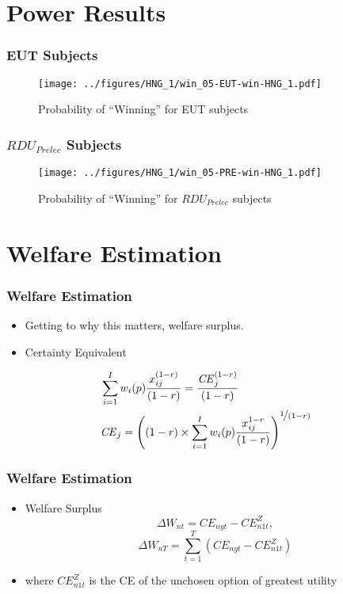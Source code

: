 \documentclass{beamer}
\newcommand\CE{\ensuremath{\mathit{CE}}}    %
\begin{document}
\section{Power Results}
\begin{frame}
\frametitle{EUT Subjects}
\begin{figure}[h!]
	\center
	\caption{Probability of \enquote{Winning} for EUT subjects}
	\texttt{[image: ../figures/HNG\_1/win\_05-EUT-win-HNG\_1.pdf]}
	\label{fig:HN1_win_eut}
\end{figure}
\end{frame}

\begin{frame}
\frametitle{ $\mathit{RDU_{Prelec}}$ Subjects}
\begin{figure}[h!]
	\center
	\caption{Probability of \enquote{Winning} for $\mathit{RDU_{Prelec}}$ subjects}
	\texttt{[image: ../figures/HNG\_1/win\_05-PRE-win-HNG\_1.pdf]}
	\label{fig:HN1_win_pre}
\end{figure}
\end{frame}

\section{Welfare Estimation}
\begin{frame}
\frametitle{Welfare Estimation}
\begin{itemize}
	\item Getting to why this matters, welfare surplus.
	\item Certainty Equivalent
\end{itemize}
\begin{align}
	\label{eq4:CEcalc}
	\begin{split}
		&\sum_{i=1}^{I} w_i(p) \frac{x_{ij}^{(1-r)}}{(1-r)} = \frac{ {\CE}_j^{(1-r)}}{(1-r)}\\
		&{\CE}_j =  \left( (1-r) \times \sum_{i=1}^{I} w_i(p) \frac{x_{ij}^{1-r}}{(1-r)} \right)^{ \displaystyle\nicefrac{1}{(1-r)} }
	\end{split}
\end{align}

\end{frame}

\begin{frame}
\frametitle{Welfare Estimation}
\begin{itemize}
	\item Welfare Surplus
	\begin{equation}
		\label{eq4:wsurplus}
		\Delta W_{nt} =  {\CE}_{nyt} - {\CE}_{n1t}^Z ,
	\end{equation}
	\begin{equation}
		\label{eq4:wsurplusT}
		\Delta W_{nT} = \sum_{t=1}^T \left( {\CE}_{nyt} - {\CE}_{n1t}^Z \right)
	\end{equation}
	\item  where ${\CE}_{n1t}^Z$ is the CE of the unchosen option of greatest utility
\end{itemize}
\end{frame}
\end{document}
